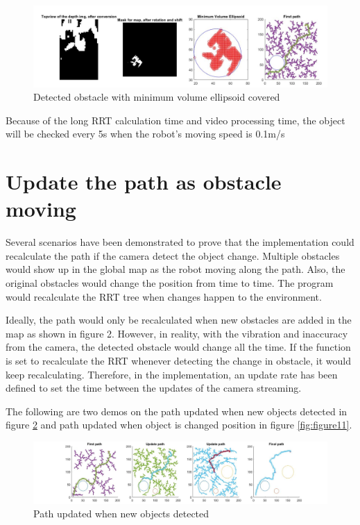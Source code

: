 \documentclass[
  oneside]{ubcthesis}
\begin{document}
\begin{figure}

{\centering \includegraphics[width=0.9\linewidth]{figures/9} 

}

\caption{Detected obstacle with minimum volume ellipsoid covered}\label{fig:figure9}
\end{figure}



Because of the long RRT calculation time and video processing time, the object will be checked every 5s when the robot's moving speed is 0.1m/s

\hypertarget{update-the-path-as-obstacle-moving}{%
\section{Update the path as obstacle moving}\label{update-the-path-as-obstacle-moving}}

Several scenarios have been demonstrated to prove that the implementation could recalculate the path if the camera detect the object change. Multiple obstacles would show up in the global map as the robot moving along the path. Also, the original obstacles would change the position from time to time. The program would recalculate the RRT tree when changes happen to the environment.

Ideally, the path would only be recalculated when new obstacles are added in the map as shown in figure 2. However, in reality, with the vibration and inaccuracy from the camera, the detected obstacle would change all the time. If the function is set to recalculate the RRT whenever detecting the change in obstacle, it would keep recalculating. Therefore, in the implementation, an update rate has been defined to set the time between the updates of the camera streaming.

The following are two demos on the path updated when new objects detected in figure \ref{fig:figure10} and path updated when object is changed position in figure \ref{fig:figure11}.

\begin{figure}

{\centering \includegraphics[width=0.9\linewidth]{figures/10} 

}

\caption{Path updated when new objects detected}\label{fig:figure10}
\end{figure}
\end{document}
